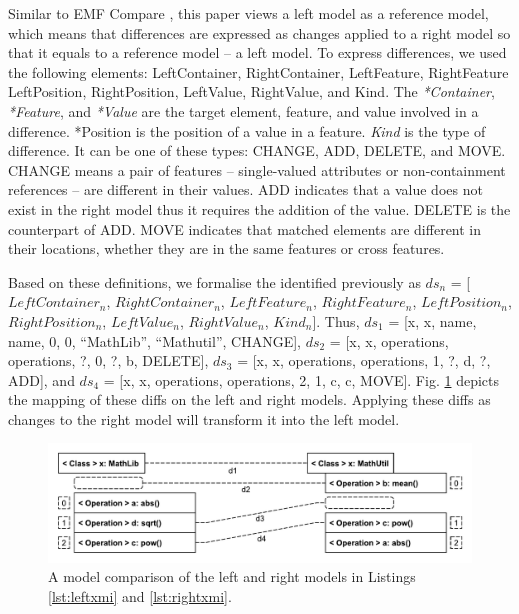 \documentclass{jot}
\begin{document}
Similar to EMF Compare \cite{emfcompare2018developer}, this paper views a left model as a reference model, which means that differences are expressed as changes applied to a right model so that it equals to a reference model -- a left model. To express differences, we used the following elements: \textsf{LeftContainer}, \textsf{RightContainer}, \textsf{LeftFeature}, \textsf{RightFeature} \textsf{LeftPosition}, \textsf{RightPosition}, \textsf{LeftValue}, \textsf{RightValue}, and \textsf{Kind}. The \textit{*Container}, \textit{*Feature}, and \textit{*Value} are the target element, feature, and value involved in a difference. \textsf{*Position} is the position of a value in a feature. \textit{Kind} is the type of difference. It can be one of these types: \textsf{CHANGE}, \textsf{ADD}, \textsf{DELETE}, and \textsf{MOVE}. \textsf{CHANGE} means a pair of features -- single-valued attributes or non-containment references -- are different in their values. \textsf{ADD} indicates that a value does not exist in the right model thus it requires the addition of the value. \textsf{DELETE} is the counterpart of \textsf{ADD}. \textsf{MOVE} indicates that matched elements are different in their locations, whether they are in the same features or cross features. 

Based on these definitions, we formalise the identified previously as $ds_{n}$ = [$LeftContainer_n$, $RightContainer_n$, $LeftFeature_n$, $RightFeature_n$, $LeftPosition_n$, $RightPosition_n$, $LeftValue_n$, $RightValue_n$, $Kind_n$]. Thus, $ds_{1}$ =  [\textsf{x}, \textsf{x}, \textsf{name}, \textsf{name}, 0, 0, ``MathLib'', ``Mathutil'', \textsf{CHANGE}], $ds_{2}$ = [\textsf{x}, \textsf{x}, \textsf{operations}, \textsf{operations}, ?, 0, ?, \textsf{b}, \textsf{DELETE}], $ds_{3}$ = [\textsf{x}, \textsf{x}, \textsf{operations}, \textsf{operations}, 1, ?, \textsf{d}, ?, \textsf{ADD}], and $ds_{4}$ = [\textsf{x}, \textsf{x}, \textsf{operations}, \textsf{operations}, 2, 1, \textsf{c}, \textsf{c}, \textsf{MOVE}]. Fig. \ref{fig:xmi_comparison} depicts the mapping of these diffs on the left and right models. Applying these diffs as changes to the right model will transform it into the left model.  

\vspace{-20pt}
\begin{figure}
    \includegraphics[width=\linewidth]{XmiComparison}
    \caption{A model comparison of the left and right models in Listings \ref{lst:leftxmi} and \ref{lst:rightxmi}.}
    \label{fig:xmi_comparison}
\end{figure}
\end{document}
